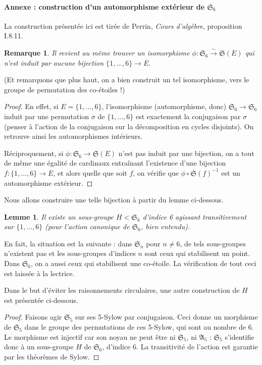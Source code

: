 \documentclass[a4paper, 11pt]{article}
\def\Sigmap{\mathfrak{S}}
\newtheorem*{lemma}{Lemme}
\newtheorem*{remark}{Remarque}
\begin{document}
\paragraph{Annexe : construction d'un automorphisme extérieur de $\Sigmap_6$} La
construction présentée ici est tirée de Perrin, \emph{Cours d'algèbre},
proposition I.8.11.

\begin{remark}
  Il revient au même trouver un isomorphisme $\phi : \Sigmap_6
  \xrightarrow{\sim} \Sigmap(E)$ qui n'est induit par aucune bijection
  $\{1,\ldots,6\} \to E$.
\end{remark}
(Et remarquons que plus haut, on a bien construit un tel isomorphisme, vers le
groupe de permutation des co-étoiles !)
\begin{proof}
  En effet, si $E = \{1,\ldots,6\}$, l'isomorphisme (automorphisme, donc)
  $\Sigmap_6 \to \Sigmap_6$ induit par une permutation $\sigma$ de
  $\{1,\ldots,6\}$ est exactement la conjugaison par $\sigma$ (penser à l'action
  de la conjugaison sur la décomposition en cycles disjoints). On retrouve ainsi
  les automorphismes intérieurs.

  Réciproquement, si $\phi : \Sigmap_6 \to \Sigmap(E)$ n'est pas induit par une
  bijection, on a tout de même une égalité de cardinaux entraînant l'existence
  d'une bijection $f : \{1,\ldots,6\} \to E$, et alors quelle que soit $f$, on
  vérifie que $\phi \circ \Sigmap(f)^{-1}$ est un automorphisme extérieur.
\end{proof}

Nous allons construire une telle bijection à partir du lemme ci-dessous.

\begin{lemma}
  Il existe un sous-groupe $H < \Sigmap_6$ d'indice 6 agissant transitivement
  sur $\{1,\ldots,6\}$ (pour l'action canonique de $\Sigmap_6$, bien entendu).
\end{lemma}
En fait, la situation est la suivante : dans $\Sigmap_n$ pour $n \neq 6$, de
tels sous-groupes n'existent pas et les sous-groupes d'indices $n$ sont ceux qui
stabilisent un point. Dans $\Sigmap_6$, on a aussi ceux qui stabilisent une
co-étoile. La vérification de tout ceci est laissée à la lectrice.

Dans le but d'éviter les raisonnements circulaires, une autre construction de
$H$ est présentée ci-dessous.
\begin{proof}
  Faisons agir $\Sigmap_5$ sur ses 5-Sylow par conjugaison. Ceci donne un
  morphisme de $\Sigmap_5$ dans le groupe des permutations de ces 5-Sylow, qui
  sont au nombre de 6. Le morphisme est injectif car son noyau ne peut être ni
  $\Sigmap_5$, ni $\mathfrak{A}_5$ : $\Sigmap_5$ s'identifie donc à un
  sous-groupe $H$ de $\Sigmap_6$, d'indice 6. La transitivité de l'action est
  garantie par les théorèmes de Sylow.
\end{proof}
\end{document}
